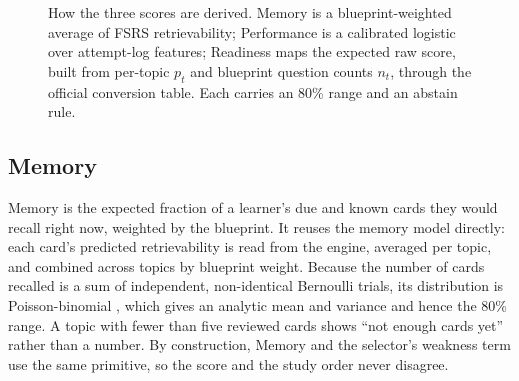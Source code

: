 \documentclass[11pt]{article}
\begin{document}
\begin{figure}[t]
\centering
{}
\caption{How the three scores are derived. Memory is a blueprint-weighted average of
FSRS retrievability; Performance is a calibrated logistic over attempt-log features;
Readiness maps the expected raw score, built from per-topic $p_t$ and blueprint question
counts $n_t$, through the official conversion table. Each carries an 80\% range and an
abstain rule.}
\label{fig:scores}
\end{figure}

\subsection{Memory}

Memory is the expected fraction of a learner's due and known cards they would recall
right now, weighted by the blueprint. It reuses the memory model directly: each
card's predicted retrievability is read from the engine, averaged per topic, and
combined across topics by blueprint weight. Because the number of cards recalled is a
sum of independent, non-identical Bernoulli trials, its distribution is
Poisson-binomial \citep{lecam1960}, which gives an analytic mean and variance and
hence the 80\% range. A topic with fewer than five reviewed cards shows ``not enough
cards yet'' rather than a number. By construction, Memory and the selector's weakness
term use the same primitive, so the score and the study order never disagree.
\end{document}
